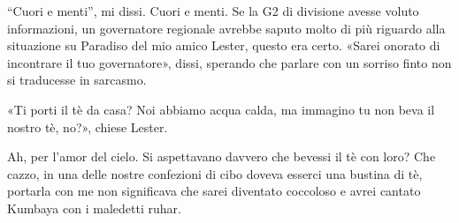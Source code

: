 ``Cuori e menti'', mi dissi. Cuori e menti. Se la G2 di divisione avesse
voluto informazioni, un governatore regionale avrebbe saputo molto di
più riguardo alla situazione su Paradiso del mio amico Lester, questo
era certo. «Sarei onorato di incontrare il tuo governatore», dissi,
sperando che parlare con un sorriso finto non si traducesse in sarcasmo.

«Ti porti il tè da casa? Noi abbiamo acqua calda, ma immagino tu non
beva il nostro tè, no?», chiese Lester.

Ah, per l'amor del cielo. Si aspettavano davvero che bevessi il tè con
loro? Che cazzo, in una delle nostre confezioni di cibo doveva esserci
una bustina di tè, portarla con me non significava che sarei diventato
coccoloso e avrei cantato Kumbaya con i maledetti ruhar.
